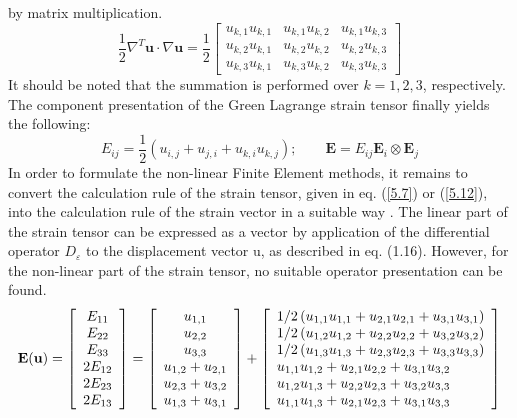 by matrix multiplication.
\begin{equation}
 \frac{1}{2} \nabla^{T} \boldsymbol{u} \cdot \nabla \boldsymbol{u}=\frac{1}{2}\left[\begin{array}{lll}u_{k, 1}u_{k, 1} & u_{k, 1}u_{k, 2} & u_{k, 1} u_{k, 3} \\ u_{k, 2}u_{k, 1} & u_{k, 2}u_{k, 2} & u_{k, 2}u_{k, 3} \\ u_{k, 3}u_{k, 1} & u_{k, 3}u_{k, 2} & u_{k, 3}u_{k, 3}\end{array}\right] 
\end{equation}
It should be noted that the summation is performed over $k = 1, 2, 3$, respectively. The component presentation of the Green Lagrange strain tensor finally yields the following:
\begin{equation}
\label{5.12}
 E_{i j}=\frac{1}{2}\left(u_{i, j}+u_{j, i}+u_{k, i} u_{k, j}\right); \qquad \boldsymbol{E}=E_{i j} \boldsymbol{E}_{i} \otimes \boldsymbol{E}_{j} 
\end{equation}
In order to formulate the non-linear Finite Element methods, it remains to convert the calculation rule of the strain tensor, given in eq. (\ref{5.7}) or (\ref{5.12}), into the calculation rule of the strain
vector in a suitable way . The linear part of the strain tensor can be expressed as a vector by
application of the differential operator $D_\varepsilon$ to the displacement vector u, as described in eq.
(1.16). However, for the non-linear part of the strain tensor, no suitable operator presentation
can be found.
\begin{equation}
\label{5.13}
    {\bf{E}}({\bf{u}}) = \left[ {\begin{array}{*{20}{c}}
{{E_{11}}}\\
{{E_{22}}}\\
{{E_{33}}}\\
{2{E_{12}}}\\
{2{E_{23}}}\\
{2{E_{13}}}
\end{array}} \right] = \left[ {\begin{array}{*{20}{c}}
{{u_{1,1}}}\\
{{u_{2,2}}}\\
{{u_{3,3}}}\\
{{u_{1,2}} + {u_{2,1}}}\\
{{u_{2,3}} + {u_{3,2}}}\\
{{u_{1,3}} + {u_{3,1}}}
\end{array}} \right] + \left[ {\begin{array}{*{20}{l}}
{1/2\left( {{u_{1,1}}{u_{1,1}} + {u_{2,1}}{u_{2,1}} + {u_{3,1}}{u_{3,1}}} \right)}\\
{1/2\left( {{u_{1,2}}{u_{1,2}} + {u_{2,2}}{u_{2,2}} + {u_{3,2}}{u_{3,2}}} \right)}\\
{1/2\left( {{u_{1,3}}{u_{1,3}} + {u_{2,3}}{u_{2,3}} + {u_{3,3}}{u_{3,3}}} \right)}\\
{{u_{1,1}}{u_{1,2}} + {u_{2,1}}{u_{2,2}} + {u_{3,1}}{u_{3,2}}}\\
{{u_{1,2}}{u_{1,3}} + {u_{2,2}}{u_{2,3}} + {u_{3,2}}{u_{3,3}}}\\
{{u_{1,1}}{u_{1,3}} + {u_{2,1}}{u_{2,3}} + {u_{3,1}}{u_{3,3}}}
\end{array}} \right]{\rm{ }}
\end{equation}
